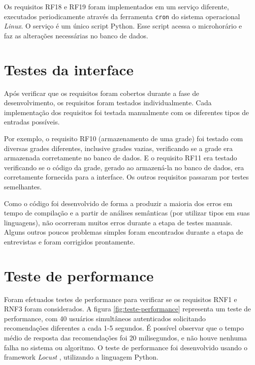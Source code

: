 Os requisitos RF18 e RF19 foram implementados em um serviço diferente, executados periodicamente através da ferramenta \verb|cron| do sistema operacional \textit{Linux}. O serviço é um único script Python. Esse script acessa o microhorário e faz as alterações necessárias no banco de dados.

\section{Testes da interface}
\label{sec:Testes da interface}

Após verificar que os requisitos foram cobertos durante a fase de desenvolvimento, os requisitos foram testados individualmente. Cada implementação dos requisitos foi testada manualmente com os diferentes tipos de entradas possíveis. 

Por exemplo, o requisito RF10 (armazenamento de uma grade) foi testado com diversas grades diferentes, inclusive grades vazias, verificando se a grade era armazenada corretamente no banco de dados. E o requisito RF11 era testado verificando se o código da grade, gerado ao armazená-la no banco de dados, era corretamente fornecida para a interface. Os outros requisitos passaram por testes semelhantes.

Como o código foi desenvolvido de forma a produzir a maioria dos erros em tempo de compilação e a partir de análises semânticas (por utilizar tipos em suas linguagens), não ocorreram muitos erros durante a etapa de testes manuais. Alguns outros poucos problemas simples foram encontrados durante a etapa de entrevistas e foram corrigidos prontamente.

\section{Teste de performance}
\label{sec:Performance}

Foram efetuados testes de performance para verificar se os requisitos RNF1 e RNF3 foram considerados. A figura \ref{fig:teste-performance} representa um teste de performance, com 40 usuários simultâneos autenticados solicitando recomendações diferentes a cada 1-5 segundos. É possível observar que o tempo médio de resposta das recomendações foi 20 milisegundos, e não houve nenhuma falha no sistema ou algoritmo. O teste de performance foi desenvolvido usando o framework \textit{Locust} \cite{site-locust}, utilizando a linguagem Python.

